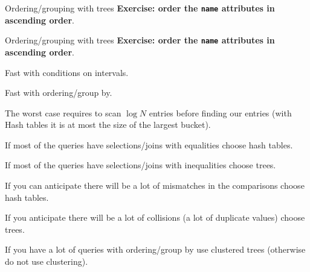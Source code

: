 \documentclass{beamer}
\begin{document}
\begin{frame}{Ordering/grouping with trees}
\textbf{Exercise: order the \texttt{name} attributes in ascending order}.
\end{frame}

\begin{frame}{Ordering/grouping with trees}
\textbf{Exercise: order the \texttt{name} attributes in ascending order}.
\end{frame}

\begin{slide}{
\item Fast with conditions on intervals.
\item Fast with ordering/group by.
\item The worst case requires to scan $\log N$ entries before finding our entries (with Hash tables it is at most the size of the largest bucket).
}\end{slide}

\begin{slide}{
\item If most of the queries have selections/joins with equalities choose hash tables.
\item If most of the queries have selections/joins with inequalities choose trees.
\item If you can anticipate there will be a lot of mismatches in the comparisons choose hash tables.
\item If you anticipate there will be a lot of collisions (a lot of duplicate values) choose trees.
\item If you have a lot of queries with ordering/group by use clustered trees (otherwise do not use clustering).
}\end{slide}
\end{document}
